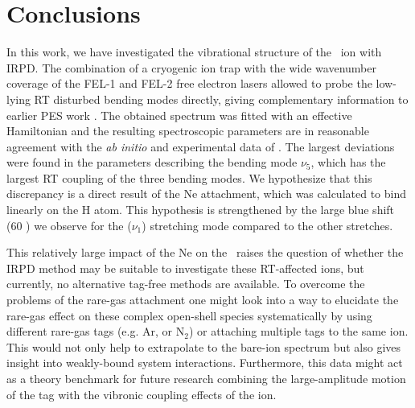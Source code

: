 \section{Conclusions}

In this work, we have investigated the vibrational structure of the \ion\ ion with
IRPD. The combination of a cryogenic ion trap with the wide wavenumber coverage of the FEL-1 and FEL-2 free electron lasers allowed to probe the low-lying RT disturbed bending modes directly, giving complementary information to earlier PES work \cite{Dai2015TheCalculations}. The obtained spectrum was fitted with an effective Hamiltonian and the resulting spectroscopic parameters are in reasonable agreement with the \emph{ab initio} and experimental data of \citet{Dai2015TheCalculations}. The largest deviations were found in the parameters describing the  bending mode $\nu_5$, which has the largest RT coupling of the three bending modes. We hypothesize that this discrepancy is a direct result of the Ne attachment, which was calculated to bind linearly on the H atom. This hypothesis is strengthened by the large blue shift (60 \wn) we observe for the  ($\nu_1$) stretching mode compared to the other stretches.

This relatively large impact of the Ne on the \ion\ raises the question of whether the IRPD method may be suitable to investigate these RT-affected ions, but currently, no alternative tag-free methods are available. To overcome the problems of the rare-gas attachment one might look into a way to elucidate the rare-gas effect on these complex open-shell species systematically by using different rare-gas tags (e.g. Ar, or N$_2$) or attaching multiple tags to the same ion. This would not only help to extrapolate to the bare-ion spectrum but also gives insight into weakly-bound system interactions. Furthermore, this data might act as a theory benchmark for future research combining the large-amplitude motion of the tag with the vibronic coupling effects of the ion.
